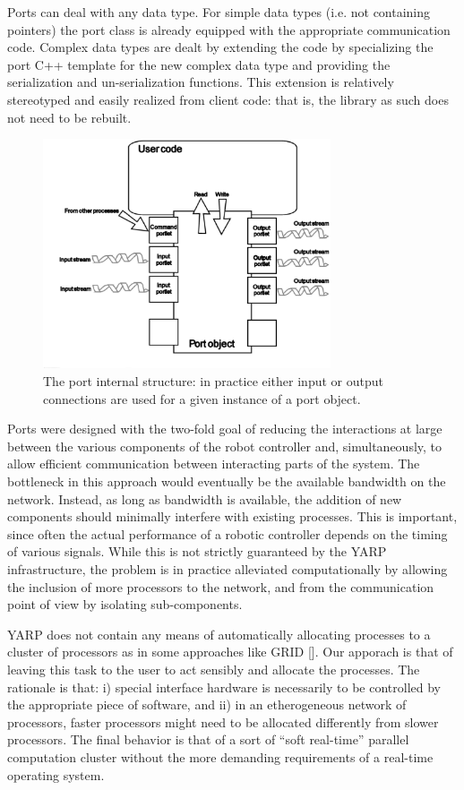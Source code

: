 Ports can deal with any data type. For simple data types (i.e. not containing pointers) 
the port class is already equipped with the appropriate communication code. Complex data
types are dealt by extending the code by specializing the port C++ template for the 
new complex data type and providing the serialization and un-serialization functions. 
This extension is relatively stereotyped and easily realized from client code: that is, 
the library as such does not need to be rebuilt.

\begin{figure}
	\centering
		\includegraphics[width=8.5cm]{port.eps}
	\caption{The port internal structure: in practice either input or output connections
	are used for a given instance of a port object.}
	\label{fig:port}
\end{figure}


Ports were designed with the two-fold goal of reducing the interactions at large between 
the various components of the robot controller and, simultaneously, to allow efficient 
communication between interacting parts of the system. The bottleneck in this approach
would eventually be the available bandwidth on the network. Instead, as long as bandwidth
is available, the addition of new components should minimally interfere with existing 
processes. This is important, since often the actual performance of a robotic controller
depends on the timing of various signals. While this is not strictly guaranteed by the 
YARP infrastructure, the problem is in practice alleviated computationally by allowing 
the inclusion of more processors to the network, and from the communication point of view
by isolating sub-components.

YARP does not contain any means of automatically allocating processes to a cluster of
processors as in some approaches like GRID []. Our apporach is that of leaving this
task to the user to act sensibly and allocate the processes. The rationale is that: i)
special interface hardware is necessarily to be controlled by the appropriate piece of 
software, and ii) in an etherogeneous network of processors, faster processors might 
need to be allocated differently from slower processors. The final behavior is that of 
a sort of ``soft real-time'' parallel computation cluster without the more demanding
requirements of a real-time operating system.

